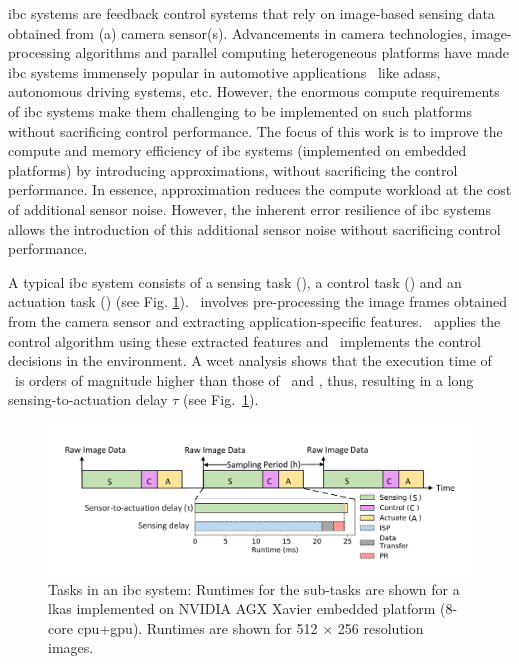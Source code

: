 \Gls{ibc} systems are feedback control systems that rely on image-based sensing data obtained from (a) camera sensor(s). Advancements in camera technologies, image-processing algorithms and parallel computing heterogeneous platforms have made \gls{ibc} systems immensely popular in automotive applications~\cite{bengler2014three} like \glspl{adas}, autonomous driving systems, etc. 
However, the enormous compute requirements of \gls{ibc} systems make them challenging to be implemented on such platforms without sacrificing control performance. The focus of this work is to improve the compute and memory efficiency of \gls{ibc} systems (implemented on embedded platforms) by introducing approximations, without sacrificing the control performance. In essence, approximation reduces the compute workload at the cost of additional sensor noise. However, the inherent error resilience of \gls{ibc} systems allows the introduction of this additional sensor noise without sacrificing control performance.
\par A typical \gls{ibc} system consists of a sensing task (\taskS), a control task (\taskC) and an actuation task (\taskA) (see Fig. \ref{fig:lkas_tasks}). \taskS\ involves pre-processing the image frames obtained from the camera sensor and extracting application-specific features. \taskC\ applies the control algorithm using these extracted features and \taskA\ implements the control decisions in the environment. A \gls{wcet} analysis shows that the execution time of \taskS\ is orders of magnitude higher than those of \taskC\ and \taskA, thus, resulting in a long sensing-to-actuation delay $\tau$ (see Fig.\ \ref{fig:lkas_tasks}). 

\begin{figure}[ht]
	\centering
	\includegraphics[width= \textwidth]{figs/profiling_lkas1_v3.pdf}
	\caption{{Tasks in an \gls{ibc} system: Runtimes for the sub-tasks are shown for a \gls{lkas} implemented on NVIDIA AGX Xavier embedded platform \cite{nvidiaAGX} (8-core \gls{cpu}+\gls{gpu}). Runtimes are shown for 512 $\times$ 256 resolution images.}}
	\label{fig:lkas_tasks}
\end{figure}

